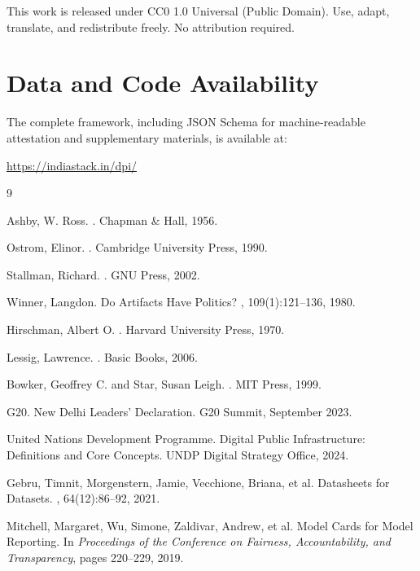 \documentclass[11pt,a4paper]{article}
\begin{document}
This work is released under CC0 1.0 Universal (Public Domain). Use, adapt, translate, and redistribute freely. No attribution required.

\section*{Data and Code Availability}

The complete framework, including JSON Schema for machine-readable attestation and supplementary materials, is available at:

\url{https://indiastack.in/dpi/}


\begin{thebibliography}{9}

Ashby, W. Ross.
.
\newblock Chapman \& Hall, 1956.

Ostrom, Elinor.
.
\newblock Cambridge University Press, 1990.

Stallman, Richard.
.
\newblock GNU Press, 2002.

Winner, Langdon.
\newblock Do Artifacts Have Politics?
, 109(1):121--136, 1980.

Hirschman, Albert O.
.
\newblock Harvard University Press, 1970.

Lessig, Lawrence.
.
\newblock Basic Books, 2006.

Bowker, Geoffrey C. and Star, Susan Leigh.
.
\newblock MIT Press, 1999.

G20.
\newblock New Delhi Leaders' Declaration.
\newblock G20 Summit, September 2023.

United Nations Development Programme.
\newblock Digital Public Infrastructure: Definitions and Core Concepts.
\newblock UNDP Digital Strategy Office, 2024.

Gebru, Timnit, Morgenstern, Jamie, Vecchione, Briana, et al.
\newblock Datasheets for Datasets.
, 64(12):86--92, 2021.

Mitchell, Margaret, Wu, Simone, Zaldivar, Andrew, et al.
\newblock Model Cards for Model Reporting.
\newblock In {\em Proceedings of the Conference on Fairness, Accountability, and Transparency}, pages 220--229, 2019.

\end{thebibliography}
\end{document}
